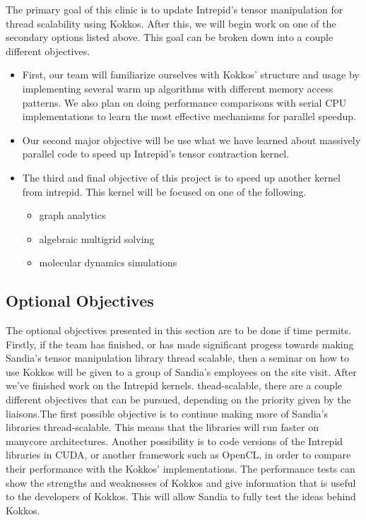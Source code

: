 \documentclass[proposal]{hmcclinic}
\begin{document}
The primary goal of this clinic is to update Intrepid's tensor
manipulation for thread scalability using Kokkos. After this, we will begin work
on one of the secondary options listed above. This goal can
be broken down into a couple different objectives. 
\begin{itemize}
\item First, our team will familiarize ourselves with Kokkos' structure and usage by 
implementing several warm up algorithms with different memory access patterns. 
We also plan on doing performance comparisons with serial CPU implementations
to learn the most effective mechanisms for parallel speedup. 
\item Our second major objective will be use what we have learned about massively parallel code to speed up Intrepid's tensor contraction kernel.  
\item The third and final objective of this project is to speed up another kernel from intrepid. 
This kernel will be focused on one of the following. 
	\begin{itemize}
		\item graph analytics
		\item algebraic multigrid solving
		\item molecular dynamics simulations
	\end{itemize}
\end{itemize}

\subsection{Optional Objectives}

The optional objectives presented in this section are to be done if time
permits. Firstly, if the team has finished, or has made significant progess
towards making Sandia's tensor manipulation library thread scalable, then a
seminar on how to use Kokkos will be given to a group of Sandia's employees on
the site visit. After we've finished work on the Intrepid kernels. 
thead-scalable, there are a couple different objectives that can be pursued,
depending on the priority given by the liaisons.The first possible objective is
to continue making more of Sandia's libraries thread-scalable. This means that 
the libraries will run faster on manycore architectures. Another possibility is to code
versions of the Intrepid libraries in CUDA, or another
framework such as OpenCL, in order to compare their performance with the Kokkos'
implementations. The performance tests can show the strengths and weaknesses of
Kokkos and give information that is useful to the developers of Kokkos. This will allow
Sandia to fully test the ideas behind Kokkos. 
\end{document}
